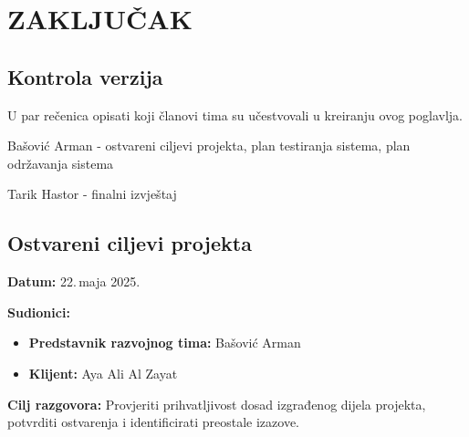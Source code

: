 \sloppy
\chapter{ZAKLJUČAK}

\sloppy
\section*{Kontrola verzija}

U par rečenica opisati koji članovi tima su učestvovali u kreiranju ovog poglavlja.

\noindent Bašović Arman - ostvareni ciljevi projekta, plan testiranja sistema, plan održavanja sistema

\noindent Tarik Hastor - finalni izvještaj

\sloppy
\section{Ostvareni ciljevi projekta}

\textbf{Datum:} 22.\,maja 2025.


\textbf{Sudionici:}
\begin{itemize}
  \item \textbf{Predstavnik razvojnog tima:} Bašović Arman
  \item \textbf{Klijent:} Aya Ali Al Zayat
\end{itemize}

\textbf{Cilj razgovora:} Provjeriti prihvatljivost dosad izgrađenog dijela projekta, potvrditi ostvarenja i identificirati preostale izazove.

\bigskip

\renewcommand{\arraystretch}{1.6}

